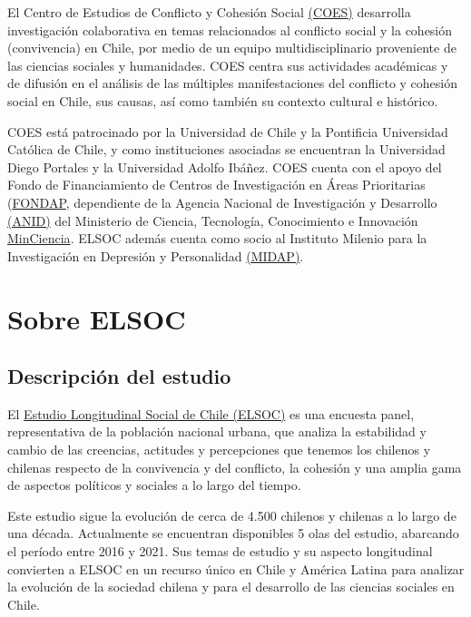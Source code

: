 \documentclass[
  12pt,
]{book}
\begin{document}
El Centro de Estudios de Conflicto y Cohesión Social \href{https://coes.cl/}{(COES)} desarrolla investigación colaborativa en temas relacionados al conflicto social y la cohesión (convivencia) en Chile, por medio de un equipo multidisciplinario proveniente de las ciencias sociales y humanidades. COES centra sus actividades académicas y de difusión en el análisis de las múltiples manifestaciones del conflicto y cohesión social en Chile, sus causas, así como también su contexto cultural e histórico.

COES está patrocinado por la Universidad de Chile y la Pontificia Universidad Católica de Chile, y como instituciones asociadas se encuentran la Universidad Diego Portales y la Universidad Adolfo Ibáñez. COES cuenta con el apoyo del Fondo de Financiamiento de Centros de Investigación en Áreas Prioritarias (\href{https://www.conicyt.cl/fondap/sobre-fondap/que-es-fondap/}{FONDAP}, dependiente de la Agencia Nacional de Investigación y Desarrollo \href{https://www.anid.cl/}{(ANID)} del Ministerio de Ciencia, Tecnología, Conocimiento e Innovación \href{https://www.minciencia.gob.cl/}{MinCiencia}. ELSOC además cuenta como socio al Instituto Milenio para la Investigación en Depresión y Personalidad \href{https://midap.org/}{(MIDAP)}.

\hypertarget{sobre-elsoc}{%
\section{Sobre ELSOC}\label{sobre-elsoc}}

\hypertarget{descripciuxf3n-del-estudio}{%
\subsection{Descripción del estudio}\label{descripciuxf3n-del-estudio}}

El \href{https://coes.cl/encuesta-panel/}{Estudio Longitudinal Social de Chile (ELSOC)} es una encuesta panel, representativa de la población nacional urbana, que analiza la estabilidad y cambio de las creencias, actitudes y percepciones que tenemos los chilenos y chilenas respecto de la convivencia y del conflicto, la cohesión y una amplia gama de aspectos políticos y sociales a lo largo del tiempo.

Este estudio sigue la evolución de cerca de 4.500 chilenos y chilenas a lo largo de una década. Actualmente se encuentran disponibles 5 olas del estudio, abarcando el período entre 2016 y 2021. Sus temas de estudio y su aspecto longitudinal convierten a ELSOC en un recurso único en Chile y América Latina para analizar la evolución de la sociedad chilena y para el desarrollo de las ciencias sociales en Chile.
\end{document}
